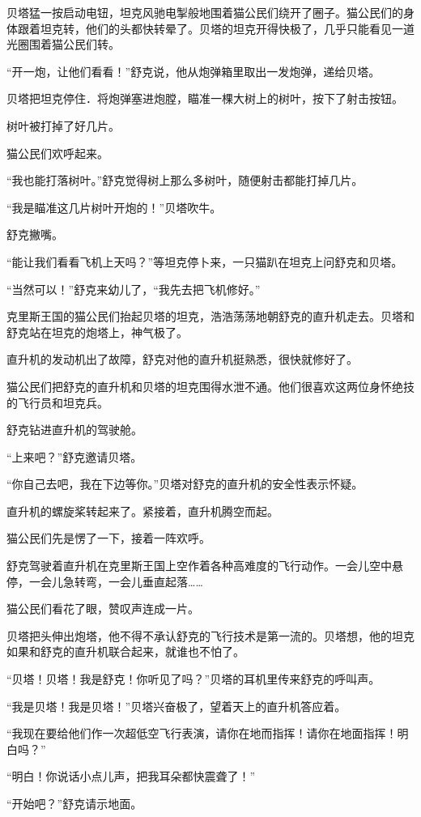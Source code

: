 \documentclass[a4paper,12pt,UTF8,twoside]{ctexbook}
\begin{document}
贝塔猛一按启动电钮，坦克风驰电掣般地围着猫公民们绕开了圈子。猫公民们的身体跟着坦克转，他们的头都快转晕了。贝塔的坦克开得快极了，几乎只能看见一道光圈围着猫公民们转。

“开一炮，让他们看看！”舒克说，他从炮弹箱里取出一发炮弹，递给贝塔。

贝塔把坦克停住．将炮弹塞进炮膛，瞄准一棵大树上的树叶，按下了射击按钮。

树叶被打掉了好几片。

猫公民们欢呼起来。

“我也能打落树叶。”舒克觉得树上那么多树叶，随便射击都能打掉几片。

“我是瞄准这几片树叶开炮的！”贝塔吹牛。

舒克撇嘴。

“能让我们看看飞机上天吗？”等坦克停卜来，一只猫趴在坦克上问舒克和贝塔。

“当然可以！”舒克来幼儿了，“我先去把飞机修好。”

克里斯王国的猫公民们抬起贝塔的坦克，浩浩荡荡地朝舒克的直升机走去。贝塔和舒克站在坦克的炮塔上，神气极了。

直升机的发动机出了故障，舒克对他的直升机挺熟悉，很快就修好了。

猫公民们把舒克的直升机和贝塔的坦克围得水泄不通。他们很喜欢这两位身怀绝技的飞行员和坦克兵。

舒克钻进直升机的驾驶舱。

“上来吧？”舒克邀请贝塔。

“你自己去吧，我在下边等你。”贝塔对舒克的直升机的安全性表示怀疑。

直升机的螺旋桨转起来了。紧接着，直升机腾空而起。

猫公民们先是愣了一下，接着一阵欢呼。

舒克驾驶着直升机在克里斯王国上空作着各种高难度的飞行动作。一会儿空中悬停，一会儿急转弯，一会儿垂直起落……

猫公民们看花了眼，赞叹声连成一片。

贝塔把头伸出炮塔，他不得不承认舒克的飞行技术是第一流的。贝塔想，他的坦克如果和舒克的直升机联合起来，就谁也不怕了。

“贝塔！贝塔！我是舒克！你听见了吗？”贝塔的耳机里传来舒克的呼叫声。

“我是贝塔！我是贝塔！”贝塔兴奋极了，望着天上的直升机答应着。

“我现在要给他们作一次超低空飞行表演，请你在地而指挥！请你在地面指挥！明白吗？”

“明白！你说话小点儿声，把我耳朵都快震聋了！”

“开始吧？”舒克请示地面。
\end{document}
